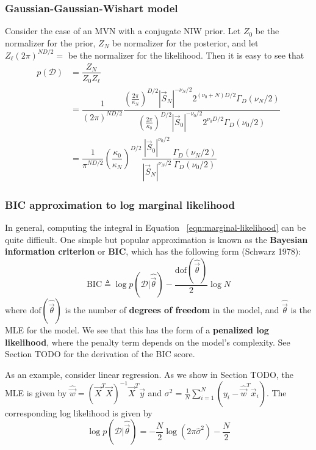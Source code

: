 \subsubsection{Gaussian-Gaussian-Wishart model}
Consider the case of an MVN with a conjugate NIW prior. Let $Z_0$ be the normalizer for the prior, $Z_N$ be normalizer for the posterior, and let $Z_{\ell}(2\pi)^{ND/2}=$ be the normalizer for the likelihood. Then it is easy to see that
\begin{align}
p(\mathcal{D})& =\dfrac{Z_N}{Z_0Z_{\ell}} \\
   & = \dfrac{1}{(2\pi)^{ND/2}}\dfrac{\left(\frac{2\pi}{\kappa_N}\right)^{D/2}|\vec{S}_N|^{-\nu_N/2}2^{(\nu_0+N)D/2}\Gamma_D(\nu_N/2)}{\left(\frac{2\pi}{\kappa_0}\right)^{D/2}|\vec{S}_0|^{-\nu_0/2}2^{\nu_0D/2}\Gamma_D(\nu_0/2)} \\
   & = \dfrac{1}{\pi^{ND/2}}\left(\dfrac{\kappa_0}{\kappa_N}\right)^{D/2}\dfrac{|\vec{S}_0|^{\nu_0/2}}{|\vec{S}_N|^{\nu_N/2}}\dfrac{\Gamma_D(\nu_N/2)}{\Gamma_D(\nu_0/2)}
\end{align}

\subsubsection{BIC approximation to log marginal likelihood}
In general, computing the integral in Equation ~\ref{eqn:marginal-likelihood} can be quite difficult. One simple but popular approximation is known as the \textbf{Bayesian information criterion} or \textbf{BIC}, which has the following form (Schwarz 1978):
\begin{equation}
\mathrm{BIC} \triangleq \log p(\mathcal{D}|\hat{\vec{\theta}})-\dfrac{\mathrm{dof}(\hat{\vec{\theta}})}{2}\log{N}
\end{equation}
where $\mathrm{dof}(\hat{\vec{\theta}})$ is the number of \textbf{degrees of freedom} in the model, and $\hat{\vec{\theta}}$ is the MLE for the model. We see that this has the form of a \textbf{penalized log likelihood}, where the penalty term depends on the model’s complexity. See Section TODO for the derivation of the BIC score.

As an example, consider linear regression. As we show in Section TODO, the MLE is given by $\hat{\vec{w}}=(\vec{X}^T\vec{X})^{-1}\vec{X}^T\vec{y}$ and $\sigma^2=\frac{1}{N}\sum_{i=1}^N (y_i-\hat{\vec{w}}^T\vec{x}_i)$. The corresponding log likelihood is given by
\begin{equation}
\log p(\mathcal{D}|\hat{\vec{\theta}}) = -\dfrac{N}{2}\log(2\pi\hat{\sigma}^2)-\dfrac{N}{2}
\end{equation}

